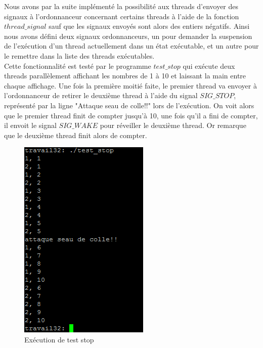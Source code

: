 	Nous avons par la suite implémenté la possibilité aux threads d'envoyer des signaux à l'ordonnanceur concernant certains threads à l'aide de la fonction $thread\_signal$ sauf que les signaux envoyés sont alors des entiers négatifs. Ainsi nous avons défini deux signaux ordonnanceurs, un pour demander la suspension de l'exécution d'un thread actuellement dans un état exécutable, et un autre pour le remettre dans la liste des threads exécutables.\\
	
	Cette fonctionnalité est testé par le programme $test\_stop$ qui exécute deux threads parallèlement affichant les nombres de 1 à 10 et laissant la main entre chaque affichage. Une fois la première moitié faite, le premier thread va envoyer à l'ordonnanceur de retirer le deuxième thread à l'aide du signal $SIG\_STOP$, représenté par la ligne "Attaque seau de colle!!" lors de l'exécution. On voit alors que le premier thread finit de compter jusqu'à 10, une fois qu'il a fini de compter, il envoit le signal $SIG\_WAKE$ pour réveiller le deuxième thread. Or remarque que le deuxième thread finit alors de compter.\\

\begin{figure}[h]
  \begin{minipage}[c]{.45\linewidth}
    \begin{center}
      \includegraphics[]{test_stop.png}
      \caption{Ex\'ecution de test stop}
      \label{test stop}
    \end{center}
  \end{minipage}
\end{figure}
